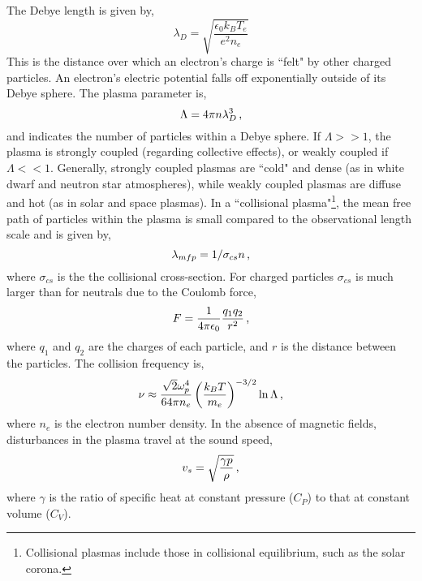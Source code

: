 The Debye length is given by,
\begin{equation}
\lambda_D = \sqrt{\frac{\epsilon_0 k_B T_e}{e^2 n_e}}  
\end{equation}
This is the distance over which an electron's charge is ``felt" by other charged particles. An electron's electric potential falls off exponentially outside of its Debye sphere. The plasma parameter is, 
\begin{equation}
\Lambda = 4 \pi n \lambda_D^3 \mbox{\,,}
\end{equation}
and indicates the number of particles within a Debye sphere. If $\Lambda >> 1$, the plasma is strongly coupled (regarding collective effects), or weakly coupled if $\Lambda << 1$. Generally, strongly coupled plasmas are ``cold" and dense (as in white dwarf and neutron star atmospheres), while weakly coupled plasmas are diffuse and hot (as in solar and space plasmas).
In a ``collisional plasma"\footnote{Collisional plasmas include those in collisional equilibrium, such as the solar corona.}, the mean free path of particles within the plasma is small compared to the observational length scale and is given by,
\begin{equation}
\lambda_{mfp} = 1/\sigma_{cs} n \mbox{\,,}
\end{equation}
where $\sigma_{cs}$ is the the collisional cross-section. For charged particles $\sigma_{cs}$ is much larger than for neutrals due to the Coulomb force,
\begin{equation}
F = \frac{1}{4\pi \epsilon_0}\frac{q_1 q_2}{r^2} \mbox{\,,}
\end{equation}
where $q_1$ and $q_2$ are the charges of each particle, and $r$ is the distance between the particles.
The collision frequency is,
\begin{equation}
\nu \approx \frac{\sqrt{2} \omega_p^4}{64 \pi n_e} \left( \frac{k_B T}{m_e} \right)^{-3/2} \ln \Lambda \mbox{\,,}
\end{equation}
where $n_e$ is the electron number density. 
In the absence of magnetic fields, disturbances in the plasma travel at the sound speed,
\begin{equation}
v_s = \sqrt{\frac{\gamma p}{\rho}} \mbox{\,,}
\end{equation}
where $\gamma$ is the ratio of specific heat at constant pressure ($C_P$) to that at constant volume ($C_V$).

